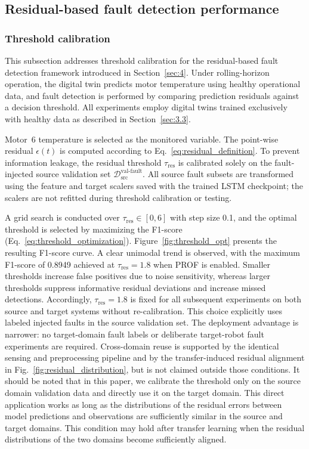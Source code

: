 \documentclass[a4paper,10pt]{cas-sc}%
\newcommand{\rev}[1]{\textcolor{revisionred}{#1}}
\begin{document}
\subsection{Residual-based fault detection performance}\label{sec:6.2}

\subsubsection{Threshold calibration}\label{sec:6.2.1}

This subsection addresses threshold calibration for the residual-based fault detection framework introduced in Section~\ref{sec:4}. Under rolling-horizon operation, the digital twin predicts motor temperature using healthy operational data, and fault detection is performed by comparing prediction residuals against a decision threshold. All experiments employ digital twins trained exclusively with healthy data as described in Section~\ref{sec:3.3}.

Motor~6 temperature is selected as the monitored variable. The point-wise residual $\epsilon(t)$ is computed according to Eq.~\eqref{eq:residual_definition}. To prevent information leakage, the residual threshold $\tau_{\mathrm{res}}$ is calibrated solely on the fault-injected source validation set $\mathcal{D}_{\text{src}}^{\text{val-fault}}$. \rev{All source fault subsets are transformed using the feature and target scalers saved with the trained LSTM checkpoint; the scalers are not refitted during threshold calibration or testing.}

\rev{A grid search is conducted over $\tau_{\mathrm{res}}\in[0,6]$ with step size 0.1, and the optimal threshold is selected by maximizing the F1-score (Eq.~\eqref{eq:threshold_optimization}). Figure~\ref{fig:threshold_opt} presents the resulting F1-score curve. A clear unimodal trend is observed, with the maximum F1-score of 0.8949 achieved at $\tau_{\mathrm{res}}=1.8$ when PROF is enabled. Smaller thresholds increase false positives due to noise sensitivity, whereas larger thresholds suppress informative residual deviations and increase missed detections.} \rev{Accordingly, $\tau_{\mathrm{res}}=1.8$ is fixed for all subsequent experiments on both source and target systems without re-calibration. This choice explicitly uses labeled injected faults in the source validation set. The deployment advantage is narrower: no target-domain fault labels or deliberate target-robot fault experiments are required. Cross-domain reuse is supported by the identical sensing and preprocessing pipeline and by the transfer-induced residual alignment in Fig.~\ref{fig:residual_distribution}, but is not claimed outside those conditions. It should be noted that in this paper, we calibrate the threshold only on the source domain validation data and directly use it on the target domain. This direct application works as long as the distributions of the residual errors between model predictions and observations are sufficiently similar in the source and target domains.
This condition may hold after transfer learning when the residual distributions of the two domains become sufficiently aligned.}
\end{document}
